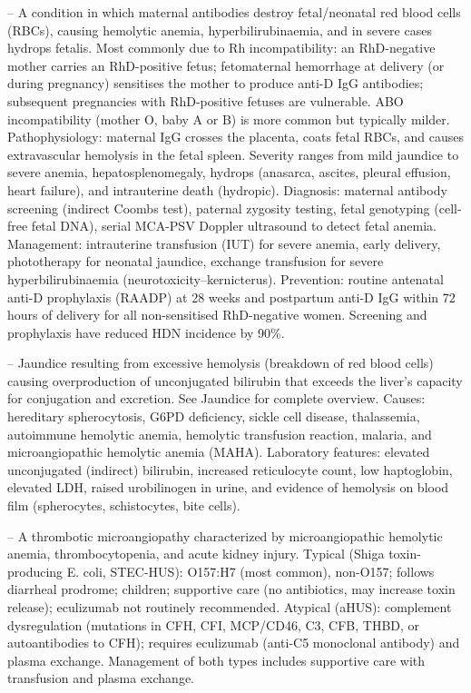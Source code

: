 -- A condition in which maternal antibodies destroy fetal/neonatal red blood cells (RBCs), causing hemolytic anemia, hyperbilirubinaemia, and in severe cases hydrops fetalis. Most commonly due to Rh incompatibility: an RhD-negative mother carries an RhD-positive fetus; fetomaternal hemorrhage at delivery (or during pregnancy) sensitises the mother to produce anti-D IgG antibodies; subsequent pregnancies with RhD-positive fetuses are vulnerable. ABO incompatibility (mother O, baby A or B) is more common but typically milder. Pathophysiology: maternal IgG crosses the placenta, coats fetal RBCs, and causes extravascular hemolysis in the fetal spleen. Severity ranges from mild jaundice to severe anemia, hepatosplenomegaly, hydrops (anasarca, ascites, pleural effusion, heart failure), and intrauterine death (hydropic). Diagnosis: maternal antibody screening (indirect Coombs test), paternal zygosity testing, fetal genotyping (cell-free fetal DNA), serial MCA-PSV Doppler ultrasound to detect fetal anemia. Management: intrauterine transfusion (IUT) for severe anemia, early delivery, phototherapy for neonatal jaundice, exchange transfusion for severe hyperbilirubinaemia (neurotoxicity--kernicterus). Prevention: routine antenatal anti-D prophylaxis (RAADP) at 28 weeks and postpartum anti-D IgG within 72 hours of delivery for all non-sensitised RhD-negative women. Screening and prophylaxis have reduced HDN incidence by 90\%.

-- Jaundice resulting from excessive hemolysis (breakdown of red blood cells) causing overproduction of unconjugated bilirubin that exceeds the liver's capacity for conjugation and excretion. See Jaundice for complete overview. Causes: hereditary spherocytosis, G6PD deficiency, sickle cell disease, thalassemia, autoimmune hemolytic anemia, hemolytic transfusion reaction, malaria, and microangiopathic hemolytic anemia (MAHA). Laboratory features: elevated unconjugated (indirect) bilirubin, increased reticulocyte count, low haptoglobin, elevated LDH, raised urobilinogen in urine, and evidence of hemolysis on blood film (spherocytes, schistocytes, bite cells).

-- A thrombotic microangiopathy characterized by microangiopathic hemolytic anemia, thrombocytopenia, and acute kidney injury. Typical (Shiga toxin-producing E. coli, STEC-HUS): O157:H7 (most common), non-O157; follows diarrheal prodrome; children; supportive care (no antibiotics, may increase toxin release); eculizumab not routinely recommended. Atypical (aHUS): complement dysregulation (mutations in CFH, CFI, MCP/CD46, C3, CFB, THBD, or autoantibodies to CFH); requires eculizumab (anti-C5 monoclonal antibody) and plasma exchange. Management of both types includes supportive care with transfusion and plasma exchange.

